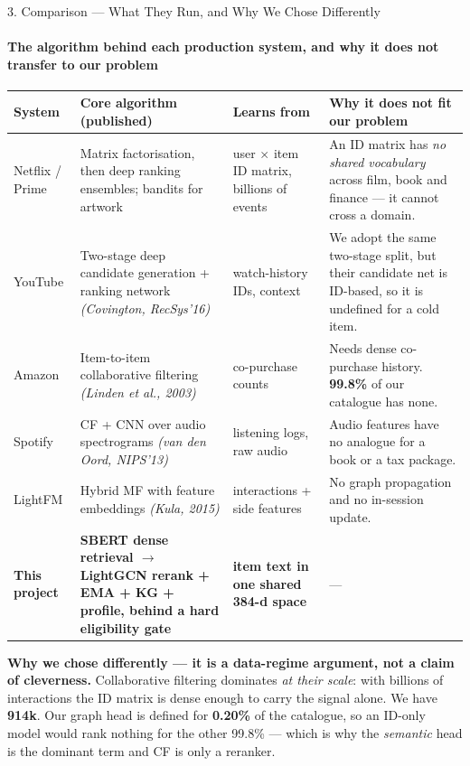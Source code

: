 \documentclass[aspectratio=169, 11pt]{beamer}
\begin{document}
\begin{frame}[shrink]{3. Comparison --- What They Run, and Why We Chose Differently}
\framesubtitle{The algorithm behind each production system, and why it does not transfer to our problem}
\vspace{1mm}
\begin{center}
{\tiny
\renewcommand{\arraystretch}{1.22}
\begin{tabular}{L{1.9cm} L{3.9cm} L{2.35cm} L{4.05cm}}
\toprule
\textbf{System} & \textbf{Core algorithm (published)} & \textbf{Learns from} & \textbf{Why it does not fit our problem}\\
\midrule
Netflix / Prime
 & Matrix factorisation, then deep ranking ensembles; bandits for artwork
 & user $\times$ item ID matrix, billions of events
 & An ID matrix has \emph{no shared vocabulary} across film, book and finance --- it cannot cross a domain.\\
YouTube
 & Two-stage deep candidate generation + ranking network \textit{(Covington, RecSys'16)}
 & watch-history IDs, context
 & We adopt the same two-stage split, but their candidate net is ID-based, so it is undefined for a cold item.\\
Amazon
 & Item-to-item collaborative filtering \textit{(Linden et al., 2003)}
 & co-purchase counts
 & Needs dense co-purchase history. \textbf{99.8\%} of our catalogue has none.\\
Spotify
 & CF + CNN over audio spectrograms \textit{(van den Oord, NIPS'13)}
 & listening logs, raw audio
 & Audio features have no analogue for a book or a tax package.\\
LightFM
 & Hybrid MF with feature embeddings \textit{(Kula, 2015)}
 & interactions + side features
 & No graph propagation and no in-session update.\\
\midrule
\textbf{This project}
 & \textbf{SBERT dense retrieval $\rightarrow$ LightGCN rerank + EMA + KG + profile, behind a hard eligibility gate}
 & \textbf{item text in one shared 384-d space}
 & ---\\
\bottomrule
\end{tabular}}
\end{center}
\vspace{1.5mm}
{\scriptsize\textbf{Why we chose differently --- it is a data-regime argument, not a claim of cleverness.}
Collaborative filtering dominates \emph{at their scale}: with billions of interactions the ID matrix is
dense enough to carry the signal alone. We have \textbf{914k}. Our graph head is defined for
\textbf{0.20\%} of the catalogue, so an ID-only model would rank nothing for the other 99.8\% --- which is
why the \emph{semantic} head is the dominant term and CF is only a reranker.}
\end{frame}
\end{document}
